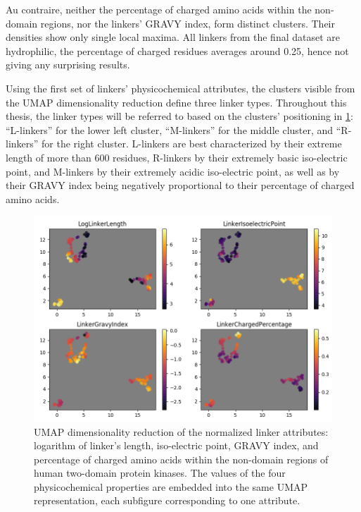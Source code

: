 		Au contraire, neither the percentage of charged amino acids within the non-domain
		regions, nor the linkers' GRAVY index, form distinct clusters.
		Their densities show only single local maxima.
		All linkers from the final dataset are hydrophilic, the percentage of charged residues
		averages around 0.25, hence not giving any surprising results.

	\label{res:first:umap}

		Using the first set of linkers' physicochemical attributes, the clusters visible from
		the UMAP dimensionality reduction define three linker types.
		Throughout this thesis, the linker types will be referred to based on the clusters'
		positioning in \cref{fig:umap}: ``L-linkers'' for the lower left cluster,
		``M-linkers'' for the middle cluster, and ``R-linkers'' for the right cluster.
		L-linkers are best characterized by their extreme length of more than 600 residues,
		R-linkers by their extremely basic iso-electric point, and M-linkers by their
		extremely acidic iso-electric point, as well as by their GRAVY index being negatively
		proportional to their percentage of charged amino acids.

		\begin{figure}
			\centering
			\includegraphics[width=\linewidth]{img/linker_umap.png}
			\caption{UMAP dimensionality reduction of the normalized linker attributes:
			logarithm of linker's length, iso-electric point, GRAVY index, and percentage of
			charged amino acids within the non-domain regions of human two-domain protein
			kinases. The values of the four physicochemical properties are embedded into the
			same UMAP representation, each subfigure corresponding to one attribute.}
			\label{fig:umap}
		\end{figure}

